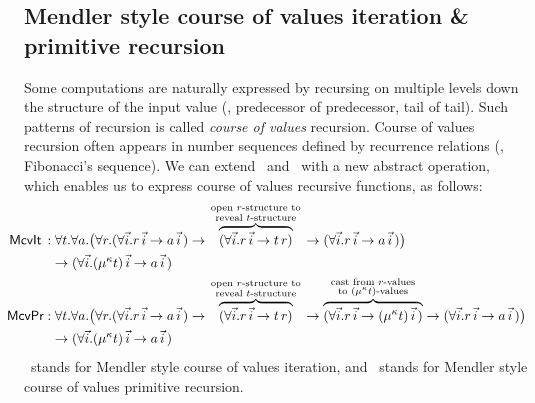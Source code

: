 \subsection{Mendler style course of values iteration \& primitive recursion}
Some computations are naturally expressed by recursing on multiple levels
down the structure of the input value (\eg, predecessor of predecessor,
tail of tail). Such patterns of recursion is called \emph{course of values}
recursion. Course of values recursion often appears in number sequences
defined by recurrence relations (\eg, Fibonacci's sequence).
We can extend \MIt\ and \MPr\ with a new abstract operation, which enables
us to express course of values recursive functions, as follows:
\label{sec:mendler:cv}
\begin{align*}
\!\!\!\!\!\!\!\!
 \McvIt\, :&\; \forall t . \forall a .
   \big( \forall r .
         (\forall\vec{i} . r\,\vec{i} -> a\,\vec{i}\,)
   -> \overbraceset{\begin{smallmatrix}
                     \text{open $r$-structure to} \\
                     \text{reveal $t$-structure} \\
                    \end{smallmatrix}}{
         (\forall\vec{i} . r\,\vec{i} -> t\,r) }
   ->    (\forall\vec{i} . r\,\vec{i} -> a\,\vec{i}\,)
   \big) \\
& -> (\forall\vec{i} . (\mu^\kappa t)\,\vec{i} -> a\,\vec{i}\,) \\
\!\!\!\!\!\!\!\!
 \McvPr :&\; \forall t . \forall a .
   \big( \forall r .   
         (\forall\vec{i} . r\,\vec{i} -> a\,\vec{i}\,)
   -> \overbraceset{\begin{smallmatrix}
                     \text{open $r$-structure to} \\
                     \text{reveal $t$-structure} \\
                    \end{smallmatrix}}{
         (\forall\vec{i} . r\,\vec{i} -> t\,r) }
   -> \overbraceset{\begin{smallmatrix}
                     \text{cast from $r$-values} \\
                     \text{to $(\mu^\kappa t)$-values} \\
                    \end{smallmatrix}}{
         (\forall\vec{i} . r\,\vec{i} -> (\mu^\kappa t)\,\vec{i}\,) }
   ->    (\forall\vec{i} . r\,\vec{i} -> a\,\vec{i}\,)
   \big)\\ 
& -> (\forall\vec{i} . (\mu^\kappa t)\,\vec{i} -> a\,\vec{i}\,)
\end{align*}
\McvIt\ stands for Mendler style course of values iteration,
and \McvPr\ stands for Mendler style course of values primitive recursion.


